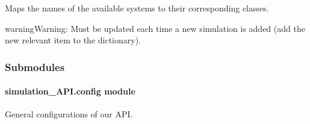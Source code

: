 \documentclass[a4paper,landscape,10pt,english]{sphinxmanual}
\begin{document}

\begin{fulllineitems}
\label{\detokenize{code_docs/simulation_api.simulation:simulation_api.simulation.simulations.Simulations}}
Maps the names of the available systems to their corresponding classes.

\begin{sphinxadmonition}{warning}{Warning:}
Must be updated each time a new simulation is added (add the new relevant item
to the dictionary).
\end{sphinxadmonition}

\end{fulllineitems}



\subsubsection{Submodules}
\label{\detokenize{code_docs/simulation_api:submodules}}

\paragraph{simulation\_API.config module}
\label{\detokenize{code_docs/simulation_api.config:module-simulation_api.config}}\label{\detokenize{code_docs/simulation_api.config:simulation-api-config-module}}\label{\detokenize{code_docs/simulation_api.config::doc}}
General configurations of our API.
\end{document}
